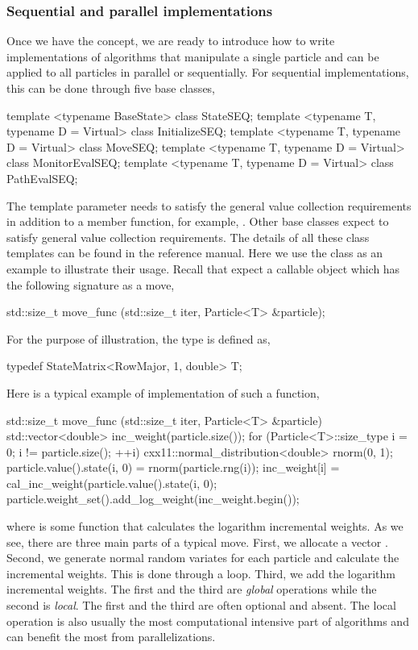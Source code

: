 \subsubsection{Sequential and parallel implementations}

Once we have the  concept, we are ready to introduce
how to write implementations of \smc algorithms that manipulate a single
particle and can be applied to all particles in parallel or sequentially. For
sequential implementations, this can be done through five base classes,
\begin{cppcode}
template <typename BaseState> class StateSEQ;
template <typename T, typename D = Virtual> class InitializeSEQ;
template <typename T, typename D = Virtual> class MoveSEQ;
template <typename T, typename D = Virtual> class MonitorEvalSEQ;
template <typename T, typename D = Virtual> class PathEvalSEQ;
\end{cppcode}
The template parameter  needs to satisfy the general value
collection requirements in addition to a  member function,
for example, . Other base classes expect  to satisfy
general value collection requirements. The details of all these class
templates can be found in the reference manual. Here we use the
 class as an example to illustrate their usage. Recall that
 expect a callable object which has the following signature
as a move,
\begin{cppcode}
std::size_t move_func (std::size_t iter, Particle<T> &particle);
\end{cppcode}
For the purpose of illustration, the type  is defined as,
\begin{cppcode}
typedef StateMatrix<RowMajor, 1, double> T;
\end{cppcode}
Here is a typical example of implementation of such a function,
\begin{cppcode}
std::size_t move_func (std::size_t iter, Particle<T> &particle)
{
    std::vector<double> inc_weight(particle.size());
    for (Particle<T>::size_type i = 0; i != particle.size(); ++i) {
        cxx11::normal_distribution<double> rnorm(0, 1);
        particle.value().state(i, 0) = rnorm(particle.rng(i));
        inc_weight[i] = cal_inc_weight(particle.value().state(i, 0);
    }
    particle.weight_set().add_log_weight(inc_weight.begin());
}
\end{cppcode}
where  is some function that calculates the logarithm
incremental weights. As we see, there are three main parts of a typical move.
First, we allocate a vector . Second, we generate normal
random variates for each particle and calculate the incremental weights. This
is done through a  loop. Third, we add the logarithm incremental
weights. The first and the third are \emph{global} operations while the second
is \emph{local}. The first and the third are often optional and absent. The
local operation is also usually the most computational intensive part of \smc
algorithms and can benefit the most from parallelizations.

